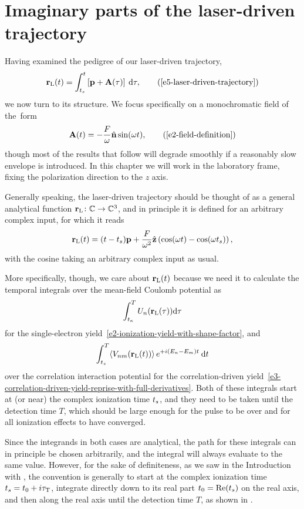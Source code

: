 \section{Imaginary parts of the laser-driven trajectory}
Having examined the pedigree of our laser-driven trajectory, 
\begin{equation}
\rl(t) = \int_{\ts}^{t} \left[\vbp+\vba(\tau) \right] \: \d\tau
,
\backtag{e5-laser-driven-trajectory}
\end{equation}
we now turn to its structure. We focus specifically on a monochromatic field of the~form
\begin{equation}
\vba(t)=-\frac{F}{\omega}\un \sin(\omega t),
\backtag{e2-field-definition}
\end{equation}
though most of the results that follow will degrade smoothly if a reasonably slow envelope is introduced. In this chapter we will work in the laboratory frame, fixing the polarization direction to the $z$ axis.

Generally speaking, the laser-driven trajectory should be thought of as a general analytical function $\vb{r}_\mathrm{L}\colon \mathbb{C}\to \mathbb{C}^3$, and in principle it is defined for an arbitrary complex input, for which it reads
\begin{equation}
\vb{r}_\mathrm{L}(t)=(t-{t_s})\vb{p} +\frac{F}{\omega^2}\hat{\vb{z}} \left(\cos(\omega t) - \cos(\omega {t_s})\right)
,
\label{e5-explicit-rl-trajectory}
\end{equation}
with the cosine taking an arbitrary complex input as usual.

More specifically, though, we care about $\vb{r}_\mathrm{L}(t)$ because we need it to calculate the temporal integrals over the mean-field Coulomb potential as 
\begin{equation}
\int_{t_\kappa}^T U_n(\vb{r}_\mathrm{L}(\tau)) \mathrm{d}\tau
\label{e5-coulomb-rl-integral}
\end{equation}
for the single-electron yield~\eqref{e2-ionization-yield-with-shape-factor}, and 
\begin{equation}
\int_{{t_s}}^T\! \left\langle V_{nm}\mathopen{}\left( \vb{r}_\mathrm{L}(t) \right)\mathclose{} \right\rangle e^{+i(E_n-E_m)t} \: \mathrm{d} t 
\end{equation}
over the correlation interaction potential for the correlation-driven yield~\eqref{e3-correlation-driven-yield-reprise-with-full-derivatives}. Both of these integrals start at (or near) the complex ionization time ${t_s}$, and they need to be taken until the detection time $T$, which should be large enough for the pulse to be over and for all ionization effects to have converged. 

Since the integrands in both cases are analytical, the path for these integrals can in principle be chosen arbitrarily, and the integral will always evaluate to the same value. However, for the sake of definiteness, as we saw in the Introduction with , the convention is generally to start at the complex ionization time ${t_s} = {t_0} + i{\tau_\mathrm{T}}$, integrate directly down to its real part ${t_0}=\Re({t_s})$ on the real axis, and then along the real axis until the detection time $T$, as shown in .


